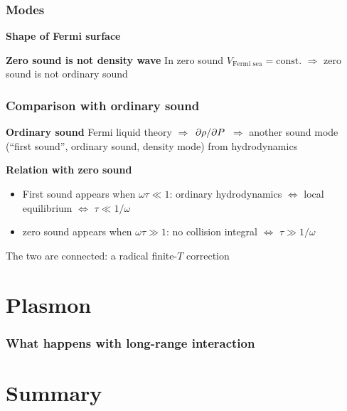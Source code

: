 \documentclass{beamer}
\begin{document}
\begin{frame}
\frametitle{Modes}

\textbf{Shape of Fermi surface}

\begin{center}
    
\end{center}

\textbf{Zero sound is not density wave} In zero sound $V_{\text{Fermi sea}} = \text{const}.$
$\Rightarrow$ zero sound is not ordinary sound

\end{frame}

\begin{frame}
\frametitle{Comparison with ordinary sound}

\textbf{Ordinary sound} Fermi liquid theory $\Rightarrow$ $\pdv*{\rho}{P}$ $\Rightarrow$
another sound mode (``first sound'', ordinary sound, density mode) from hydrodynamics

\vspace{0.5cm}

\textbf{Relation with zero sound} 
\begin{itemize}
    \item First sound appears when $\omega \tau \ll 1$:
    ordinary hydrodynamics $\Leftrightarrow$ local equilibrium $\Leftrightarrow$ $\tau \ll 1 / \omega$
    \item zero sound appears when $\omega \tau \gg 1$: 
    no collision integral $\Leftrightarrow$ $\tau \gg 1 / \omega$
\end{itemize}

The two are connected: a radical finite-$T$ correction

\begin{center}
    
\end{center}    

\end{frame}

\section{Plasmon}

\begin{frame}
\frametitle{What happens with long-range interaction}



\end{frame}

\section{Summary}
\end{document}
